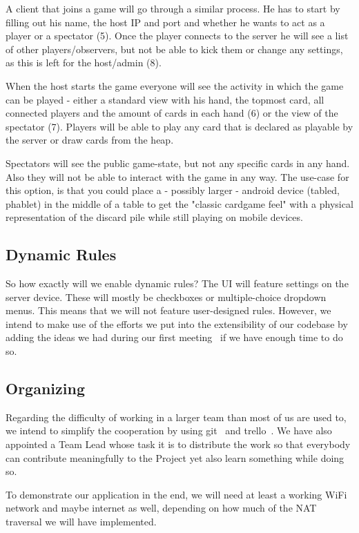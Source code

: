 \documentclass{report}
\begin{document}
A client that joins a game will go through a similar process. He has to start by filling out his name, the host IP and port and whether he wants to act as a player or a spectator (5). Once the player connects to the server he will see a list of other players/observers, but not be able to kick them or change any settings, as this is left for the host/admin (8). 

When the host starts the game everyone will see the activity in which the game can be played - either a standard view with his hand, the topmost card, all connected players and the amount of cards in each hand (6) or the view of the spectator (7). Players will be able to play any card that is declared as playable by the server or draw cards from the heap.

Spectators will see the public game-state, but not any specific cards in any hand. Also they will not be able to interact with the game in any way. The use-case for this option, is that you could place a - possibly larger - android device (tabled, phablet) in the middle of a table to get the "classic cardgame feel" with a physical representation of the discard pile while still playing on mobile devices. 

\subsection{Dynamic Rules}
So how exactly will we enable dynamic rules? The UI will feature settings on the server device. These will mostly be checkboxes or multiple-choice dropdown menus. This means that we will not feature user-designed rules. However, we intend to make use of the efforts we put into the extensibility of our codebase by adding the ideas we had during our first meeting~\cite{firstprotocol} if we have enough time to do so.

\subsection{Organizing}

Regarding the difficulty of working in a larger team than most of us are used to, we intend to simplify the cooperation by using git~\cite{github} and trello~\cite{trello}. We have also appointed a Team Lead whose task it is to distribute the work so that everybody can contribute meaningfully to the Project yet also learn something while doing so.

To demonstrate our application in the end, we will need at least a working WiFi network and maybe internet as well, depending on how much of the NAT traversal we will have implemented.
\end{document}
